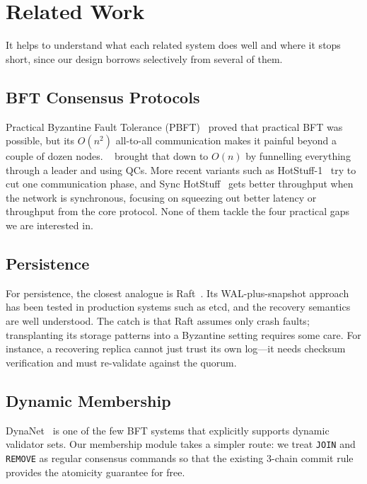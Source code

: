 \chapter{Related Work}
\label{sec:related_work}

It helps to understand what each related system does well and where it
stops short, since our design borrows selectively from several of them.

\section{BFT Consensus Protocols}

Practical Byzantine Fault Tolerance (PBFT)~\cite{pbft1999} proved that
practical BFT was possible, but its $O(n^2)$ all-to-all communication
makes it painful beyond a couple of dozen nodes.
\hotstuff{}~\cite{hotstuff2019} brought that down to $O(n)$ by
funnelling everything through a leader and using QCs.  More recent
variants such as HotStuff-1~\cite{hotstuff1_2024} try to cut one
communication phase, and Sync HotStuff~\cite{synchotstuff2020} gets
better throughput when the network is synchronous, focusing on
squeezing out better latency or throughput from the core protocol.
None of them tackle the four practical gaps we are interested in.

\section{Persistence}

For persistence, the closest analogue is Raft~\cite{raft2014}.  Its
WAL-plus-snapshot approach has been tested in production systems such
as etcd, and the recovery semantics are well understood.  The catch is
that Raft assumes only crash faults; transplanting its storage patterns
into a Byzantine setting requires some care.  For instance, a
recovering replica cannot just trust its own log---it needs checksum
verification and must re-validate against the quorum.

\section{Dynamic Membership}

DynaNet~\cite{dynanet2025} is one of the few BFT systems that
explicitly supports dynamic validator sets.  Our membership module
takes a simpler route: we treat \texttt{JOIN} and \texttt{REMOVE} as
regular consensus commands so that the existing 3-chain commit rule
provides the atomicity guarantee for free.

